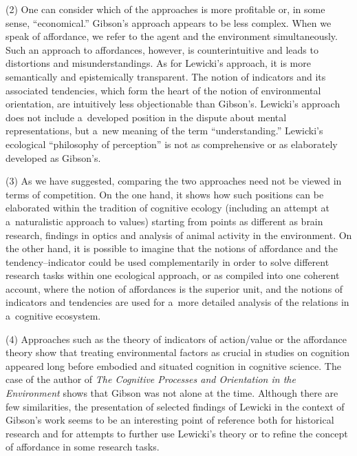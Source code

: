 (2) One can consider which of the approaches is more profitable or, in some sense, ``economical.'' Gibson's approach appears to be less complex. When we speak of affordance, we refer to the agent and the environment simultaneously. Such an approach to affordances, however, is counterintuitive and leads to distortions and misunderstandings. As for Lewicki's approach, it is more semantically and epistemically transparent. The notion of indicators and its associated tendencies, which form the heart of the notion of environmental orientation, are intuitively less objectionable than Gibson's. Lewicki's approach does not include a~developed position in the dispute about mental representations, but a~new meaning of the term ``understanding.'' Lewicki's ecological ``philosophy of perception'' is not as comprehensive or as elaborately developed as Gibson's.



(3) As we have suggested, comparing the two approaches need not be viewed in terms of competition. On the one hand, it shows how such positions can be elaborated within the tradition of cognitive ecology (including an attempt at a~naturalistic approach to values) starting from points as different as brain research, findings in optics and analysis of animal activity in the environment. On the other hand, it is possible to imagine that the notions of affordance and the tendency–indicator could be used complementarily in order to solve different research tasks within one ecological approach, or as compiled into one coherent account, where the notion of affordances is the superior unit, and the notions of indicators and tendencies are used for a~more detailed analysis of the relations in a~cognitive ecosystem.



(4) Approaches such as the theory of indicators of action/value or the affordance theory show that treating environmental factors as crucial in studies on cognition appeared long before embodied and situated cognition in cognitive science. The case of the author of \textit{The Cognitive Processes and Orientation in the Environment} shows that Gibson was not alone at the time. Although there are few similarities, the presentation of selected findings of Lewicki in the context of Gibson's work seems to be an interesting point of reference both for historical research and for attempts to further use Lewicki's theory or to refine the concept of affordance in some research tasks.



